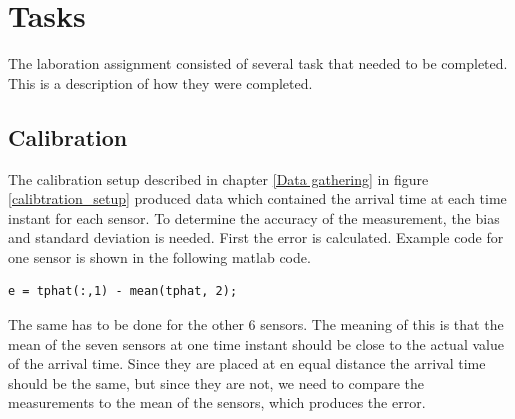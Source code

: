 \documentclass[10pt,a4paper]{report}
\begin{document}
\newpage
\chapter{Tasks}
\label{Tasks}
The laboration assignment consisted of several task that needed to be completed. This is a description of how they were completed.

\section{Calibration}
\label{Calibration}
The calibration setup described in chapter \ref{Data gathering} in figure \ref{calibtration_setup} produced data which contained the arrival time at each time instant for each sensor. To determine the accuracy of the measurement, the bias and standard deviation is needed. First the error is calculated. Example code for one sensor is shown in the following matlab code. 
\begin{verbatim}
e = tphat(:,1) - mean(tphat, 2);
\end{verbatim}
The same has to be done for the other 6 sensors. The meaning of this is that the mean of the seven sensors at one time instant should be close to the actual value of the arrival time. Since they are placed at en equal distance the arrival time should be the same, but since they are not, we need to compare the measurements to the mean of the sensors, which produces the error.
\end{document}
